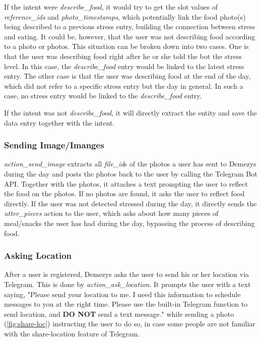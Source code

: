 If the intent were \emph{describe\_food}, it would try to get the slot values of \emph{reference\_ids} and \emph{photo\_timestamps}, which potentially link the food photo(s) being described to a previous stress entry, building the connection between stress and eating. It could be, however, that the user was not describing food according to a photo or photos. This situation can be broken down into two cases. One is that the user was describing food right after he or she told the bot the stress level. In this case, the \emph{describe\_food} entry would be linked to the latest stress entry. The other case is that the user was describing food at the end of the day, which did not refer to a specific stress entry but the day in general. In such a case, no stress entry would be linked to the \emph{describe\_food} entry.

If the intent was not \emph{describe\_food}, it will directly extract the entity and save the data entry together with the intent.

\subsubsection{Sending Image/Imanges}
\emph{action\_send\_image} extracts all \emph{file\_id}s of the photos a user has sent to Demezys during the day and posts the photos back to the user by calling the Telegram Bot API. Together with the photos, it attaches a text prompting the user to reflect the food on the photos. If no photos are found, it asks the user to reflect food directly. If the user was not detected stressed during the day, it directly sends the \emph{utter\_pieces} action to the user, which asks about how many pieces of meal/snacks the user has had during the day, bypassing the process of describing food.

\subsubsection{Asking Location}
After a user is registered, Demezys asks the user to send his or her location via Telegram. This is done by \emph{action\_ask\_location}. It prompts the user with a text saying, "Please send your location to me. I need this information to schedule messages to you at the right time. Please use the built-in Telegram function to send location, and \textbf{DO NOT} send a text message." while sending a photo (\autoref{fig:share-loc}) instructing the user to do so, in case some people are not familiar with the share-location feature of Telegram.

